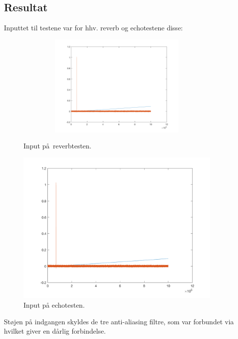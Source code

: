 \subsection{Resultat}
Inputtet til testene var for hhv. reverb og echotestene disse:
\begin{figure}[!ht]
		\centering
	\begin{minipage}{0.50\textwidth}
		\centering
		\includegraphics[width=0.9\textwidth, height=5cm]{billeder/reverb_input.png}
		\caption{Input på reverbtesten.}
	\end{minipage}\hfill
	\begin{minipage}{0.50\textwidth}
		\centering
		\includegraphics[width=0.9\textwidth, height=5 cm]{billeder/echo_input.png}
		\caption{Input på echotesten.}
	\end{minipage}
\end{figure}
Støjen på indgangen skyldes de tre anti-aliasing filtre, som var forbundet via  hvilket giver en dårlig forbindelse.\newline
